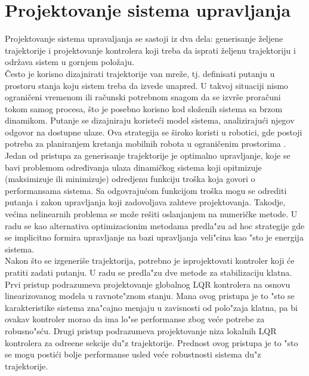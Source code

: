 \documentclass[a4paper,11pt]{article}
\theoremstyle{definition} \newtheorem{deff}{Definicija}[section]
\theoremstyle{definition} \newtheorem{prim}[deff]{Primer}
\theoremstyle{plain} \newtheorem{teor}[deff]{Teorema}
\begin{document}
	
	
	
	
	
	\newpage
	
	
	
	\section{Projektovanje sistema upravljanja}
	
	Projektovanje sistema upravaljanja se sastoji iz dva dela: generisanje željene trajektorije i projektovanje kontrolera koji treba da isprati željenu trajektoriju i održava sistem u gornjem položaju. \\
	
	Često je korisno dizajnirati trajektorije van mreže, tj. definisati putanju u prostoru stanja koju sistem treba da izvede unapred. U takvoj situaciji nismo ograničeni vremenom ili računski potrebnom snagom da se izvrše proračuni tokom samog procesa, što je posebno korisno kod složenih sistema sa brzom dinamikom. Putanje se dizajniraju koristeći model sistema, analizirajući njegov odgovor na dostupne ulaze. Ova strategija se široko koristi u robotici, gde postoji potreba za planiranjem kretanja mobilnih robota u ograničenim prostorima \cite{inicijalna}. \\
	
	Jedan od pristupa za generisanje trajektorije je optimalno upravljanje,  koje se bavi problemom određivanja ulaza dinamičkog sistema koji opitmizuje (maksimizuje ili minimizuje) odredjenu funkciju troška koja govori o performansama sistema. Sa odgovrajućom funkcijom troška mogu se odrediti putanja i zakon upravljanja koji zadovoljava zahteve projektovanja. Takodje, većina nelinearnih problema se može rešiti oslanjanjem na numeričke metode. U radu se \cite{inicijalna} kao alternativa optimizacionim metodama predla"zu ad hoc strategije gde se implicitno formira upravljanje na bazi upravljanja veli"cina kao "sto je energija sistema. \\
	
	Nakon što se izgeneriše trajektorija, potrebno je isprojektovati kontroler koji će pratiti zadati putanju. U radu \cite{inicijalna} se predla"zu dve metode za stabilizaciju klatna. Prvi pristup podrazumeva projektovanje globalnog LQR kontrolera na osnovu linearizovanog modela u ravnote"znom stanju. Mana ovog pristupa je to "sto se karakteristike sistema zna"cajno menjaju u zavisnosti od polo"zaja klatna, pa bi ovakav kontroler morao da ima lo"se performanse zbog ve\'ce potrebe za robusno"s\'cu. Drugi pristup podrazumeva projektovanje niza lokalnih LQR kontrolera za odre\dj ene sekcije du"z trajektorije. Prednost ovog pristupa je to "sto se mogu posti\'ci bolje performanse usled ve\'ce robustnosti sistema du"z trajektorije.  \\[16pt]
	
\end{document}

